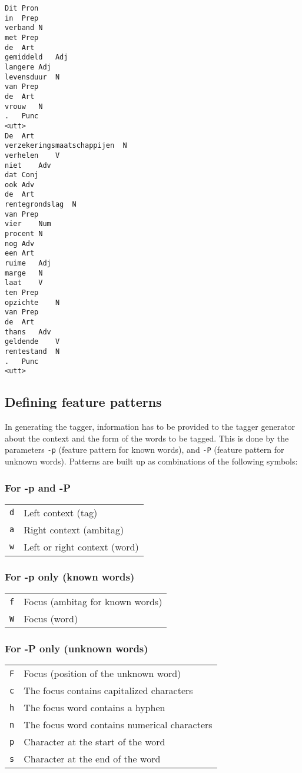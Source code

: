 \documentclass{report}
\begin{document}
{\footnotesize
\begin{verbatim}
Dit	Pron
in	Prep
verband	N
met	Prep
de	Art
gemiddeld	Adj
langere	Adj
levensduur	N
van	Prep
de	Art
vrouw	N
.	Punc
<utt>
De	Art
verzekeringsmaatschappijen	N
verhelen	V
niet	Adv
dat	Conj
ook	Adv
de	Art
rentegrondslag	N
van	Prep
vier	Num
procent	N
nog	Adv
een	Art
ruime	Adj
marge	N
laat	V
ten	Prep
opzichte	N
van	Prep
de	Art
thans	Adv
geldende	V
rentestand	N
.	Punc
<utt>
\end{verbatim}
}


\subsection{Defining feature patterns}

In generating the tagger, information has to be provided to the
tagger generator about the context and the form of the words to be
tagged. This is done by the parameters {\tt -p} (feature pattern for known
words), and {\tt -P} (feature pattern for unknown words). Patterns are
built up as combinations of the following symbols:

\subsubsection*{For -p and -P}

\begin{tabular}{ll}
{\tt d} & Left context (tag)\\
{\tt a} & Right context (ambitag)\\
{\tt w} & Left or right context (word)\\
\end{tabular}

\subsubsection*{For -p only (known words)}

\begin{tabular}{ll}
{\tt f} & Focus (ambitag for known words)\\
{\tt W} & Focus (word)\\
\end{tabular}

\subsubsection{For -P only (unknown words)}

\begin{tabular}{ll}
{\tt F} & Focus (position of the unknown word) \\
{\tt c} & The focus contains capitalized characters \\
{\tt h} & The focus word contains a hyphen\\
{\tt n} & The focus word contains numerical characters \\
{\tt p} & Character at the start of the word \\
{\tt s} & Character at the end of the word \\
\end{tabular}
\end{document}
